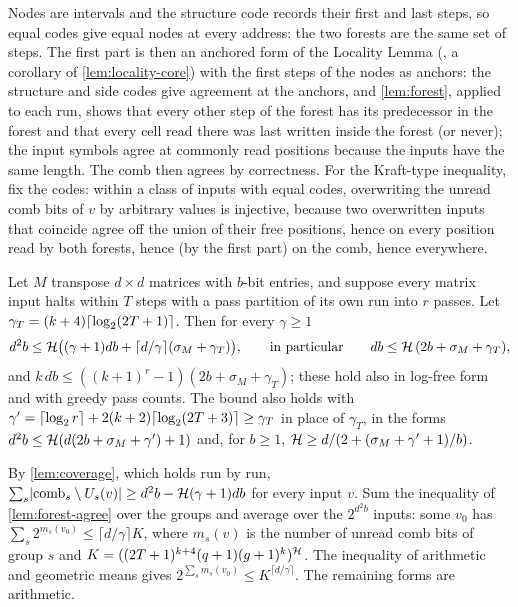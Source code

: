 \begin{outline}
Nodes are intervals and the structure code records their first and last steps, so equal codes give equal
nodes at every address: the two forests are the same set of steps. The first part is then an anchored form
of the Locality Lemma (, a corollary of \cref{lem:locality-core}) with the first
steps of the nodes as anchors: the structure and side codes give agreement at the anchors, and
\cref{lem:forest}, applied to each run, shows that every other step of the forest has its predecessor in
the forest and that every cell read there was last written inside the forest (or never); the input symbols
agree at commonly read positions because the inputs have the same length. The comb then agrees by
correctness. For
the Kraft-type inequality, fix the codes: within a class of inputs with equal codes, overwriting
the unread comb bits of $v$ by arbitrary values is injective, because two overwritten inputs that
coincide agree off the union of their free positions, hence on every position read by both
forests, hence (by the first part) on the comb, hence everywhere.
\end{outline}

\begin{theorem}[Theorem P$'$]\label{thm:Pprime}
Let $M$ transpose $d\times d$ matrices with $b$-bit entries, and suppose every matrix input halts
within $T$ steps with a pass partition of its own run into $r$ passes. Let
$\gamma_T=(k+4)\lceil \log_2 (2T+1) \rceil$. Then for every $\gamma\ge1$
\[
  d^2b\le\mathcal{H}\bigl((\gamma+1)db+\lceil d/\gamma\rceil(\sigma_M+\gamma_T)\bigr),
  \qquad\text{in particular}\qquad db\le\mathcal{H}\,(2b+\sigma_M+\gamma_T),
\]
and $k\,db\le((k+1)^r-1)(2b+\sigma_M+\gamma_T)$; these hold also in log-free form and with greedy pass
counts. The bound also holds with
$\gamma'=\lceil \log_2 r \rceil+2(k+2)\lceil \log_2 (2T+3) \rceil\ge\gamma_T$ in place of $\gamma_T$, in the forms
$d^2b\le\mathcal{H}(d(2b+\sigma_M+\gamma')+1)$ and, for $b\ge1$,
$\mathcal{H}\ge d/(2+(\sigma_M+\gamma'+1)/b)$.
\end{theorem}

\begin{outline}
By \cref{lem:coverage}, which holds run by run,
$\sum_s\lvert \mathrm{comb}_s\setminus U_s(v) \rvert\ge d^2b-\mathcal{H}(\gamma+1)db$ for every input $v$. Sum
the inequality of \cref{lem:forest-agree} over the groups and average over the $2^{d^2b}$ inputs:
some $v_0$ has $\sum_s2^{m_s(v_0)}\le\lceil d/\gamma\rceil K$, where $m_s(v)$ is the number of
unread comb bits of group $s$ and $K=((2T+1)^{k+4}(q+1)(g+1)^k)^{\mathcal{H}}$. The inequality of
arithmetic and geometric means gives $2^{\sum_sm_s(v_0)}\le K^{\lceil d/\gamma\rceil}$. The
remaining forms are arithmetic.
\end{outline}

